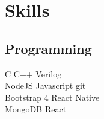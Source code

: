 \documentclass[]{Resume}
\begin{document}
\begin{minipage}[t]{0.33\textwidth}
\vspace{\topsep}
\vspace{\topsep}
\section{Skills}
\vspace{\topsep}
\subsection{Programming}
C \textbullet{} C++ \textbullet{} Verilog \\
NodeJS \textbullet{} Javascript \textbullet{}
git \\
Bootstrap 4 \textbullet{} React Native\\ 
MongoDB  \textbullet{} React \\
\sectionsep

%
%

\end{minipage} 
\hfill
\end{document}

